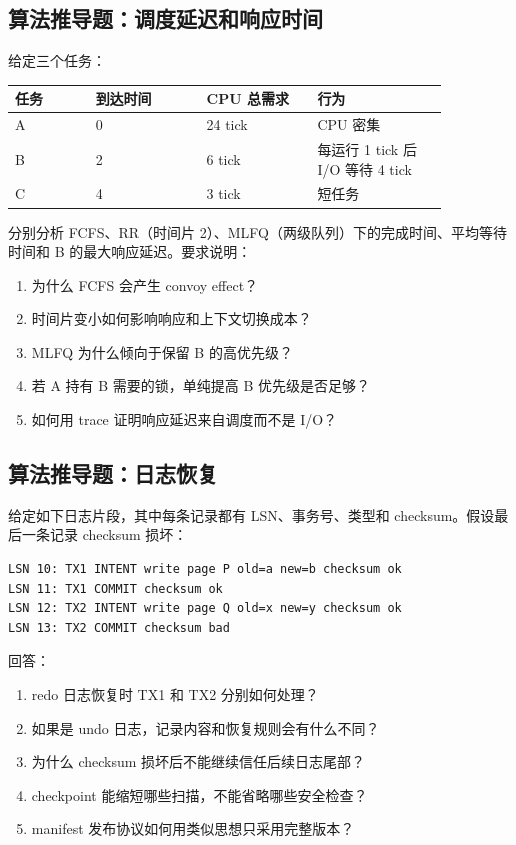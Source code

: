 \subsection{算法推导题：调度延迟和响应时间}

给定三个任务：

\begin{longtable}{p{0.16\linewidth}p{0.22\linewidth}p{0.22\linewidth}p{0.26\linewidth}}
\toprule
任务 & 到达时间 & CPU 总需求 & 行为 \\
\midrule
A & 0 & 24 tick & CPU 密集 \\
B & 2 & 6 tick & 每运行 1 tick 后 I/O 等待 4 tick \\
C & 4 & 3 tick & 短任务 \\
\bottomrule
\end{longtable}

分别分析 FCFS、RR（时间片 2）、MLFQ（两级队列）下的完成时间、平均等待时间和 B 的最大响应延迟。要求说明：

\begin{enumerate}
\tightlist
\item 为什么 FCFS 会产生 convoy effect？
\item 时间片变小如何影响响应和上下文切换成本？
\item MLFQ 为什么倾向于保留 B 的高优先级？
\item 若 A 持有 B 需要的锁，单纯提高 B 优先级是否足够？
\item 如何用 trace 证明响应延迟来自调度而不是 I/O？
\end{enumerate}

\subsection{算法推导题：日志恢复}

给定如下日志片段，其中每条记录都有 LSN、事务号、类型和 checksum。假设最后一条记录 checksum 损坏：

\begin{lstlisting}
LSN 10: TX1 INTENT write page P old=a new=b checksum ok
LSN 11: TX1 COMMIT checksum ok
LSN 12: TX2 INTENT write page Q old=x new=y checksum ok
LSN 13: TX2 COMMIT checksum bad
\end{lstlisting}

回答：

\begin{enumerate}
\tightlist
\item redo 日志恢复时 TX1 和 TX2 分别如何处理？
\item 如果是 undo 日志，记录内容和恢复规则会有什么不同？
\item 为什么 checksum 损坏后不能继续信任后续日志尾部？
\item checkpoint 能缩短哪些扫描，不能省略哪些安全检查？
\item manifest 发布协议如何用类似思想只采用完整版本？
\end{enumerate}

